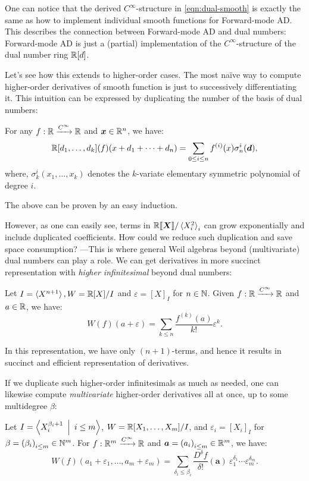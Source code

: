 One can notice that the derived $C^\infty$-structure in \eqref{eqn:dual-smooth} is exactly the same as how to implement individual smooth functions for Forward-mode AD.
This describes the connection between Forward-mode AD and dual numbers: Forward-mode AD is just a (partial) implementation of the $C^\infty$-structure of the dual number ring $\mathbb{R}[d]$.

Let's see how this extends to higher-order cases.
The most naïve way to compute higher-order derivatives of smooth function is just to successively differentiating it.
This intuition can be expressed by duplicating the number of the basis of dual numbers:
\begin{theorem}\label{thm:univ-partial-duals}
  For any $f: \mathbb{R} \xrightarrow{C^\infty} \mathbb{R}$ and $\boldsymbol{x} \in \mathbb{R}^n$, we have:
  \[
    \R[d_1, \dots, d_k](f)(x + d_1 + \cdots + d_n) 
    = \sum_{0 \leq i \leq n} f^{(i)}(x)\sigma^i_n(\vec{d}),
  \]
  where, $\sigma^i_k(x_1, \dots, x_k)$ denotes the $k$-variate elementary symmetric polynomial of degree $i$.
\end{theorem}

The above can be proven by an easy induction.

However, as one can easily see, terms in $\mathord{\mathbb{R}\llbracket\boldsymbol{X}\rrbracket}/\braket{X_i^2}_i$ can grow exponentially and include duplicated coefficients.
How could we reduce such duplication and save space consumption? ---This is where general Weil algebras beyond (multivariate) dual numbers can play a role.
We can get derivatives in more succinct representation with \emph{higher infinitesimal} beyond dual numbers:

\begin{lemma}\label{lem:higher-infinitesimal}
  Let $I = \braket{X^{n + 1}}, W = \mathbb{R}[X]/I$ and $\varepsilon = {[X]}_I$ for $n \in \mathbb{N}$.
  Given $f: \mathbb{R} \xrightarrow{C^\infty} \mathbb{R}$ and $a \in \mathbb{R}$, we have:
  \[
    W(f)(a + \varepsilon)
    = \sum_{k \leq n} \frac{f^{(k)}(a)}{k !} \varepsilon^k.
  \]
\end{lemma}
In this representation, we have only $(n + 1)$-terms, and hence it results in succinct and efficient representation of derivatives.

If we duplicate such higher-order infinitesimals as much as needed, one can likewise compute \emph{multivariate} higher-order derivatives all at once, up to some multidegree $\beta$:
\begin{lemma}
  Let $I = \Braket{X_i^{\beta_i + 1}\ |\ i \leq m}$, $W = \mathbb{R}[X_1, \dots, X_m]/I$, and $\varepsilon_i = {[X_i]}_I$ for $\beta = {(\beta_i)}_{i \leq m} \in \mathbb{N}^m$.
  For $f: \mathbb{R}^m \xrightarrow{C^\infty} \mathbb{R}$ and $\boldsymbol{a} = {(a_i)}_{i \leq m} \in \mathbb{R}^m$, we have:
  \[
    W(f)(a_1 + \varepsilon_1, \dots, a_m + \varepsilon_m) =
      \sum_{\delta_i \leq \beta_i} 
      \frac{D^\delta f}{\delta !}(\boldsymbol{a})\ \varepsilon_1^{\delta_1} \cdots \varepsilon_m^{\delta_m}.
  \]
\end{lemma}

